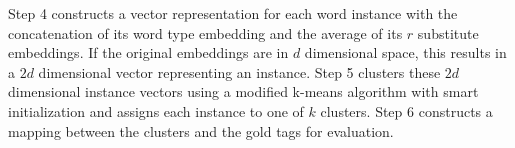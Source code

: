 
Step 4 constructs a vector representation for each word instance with the
concatenation of its word type embedding and the average of its $r$ substitute
embeddings.  If the original embeddings are in $d$ dimensional space, this
results in a $2d$ dimensional vector representing an instance.  Step 5 clusters
these $2d$ dimensional instance vectors using a modified k-means algorithm with
smart initialization \cite{arthur2007k} and assigns each instance to one of $k$
clusters.  Step 6 constructs a mapping between the clusters and the gold tags
for evaluation.  



